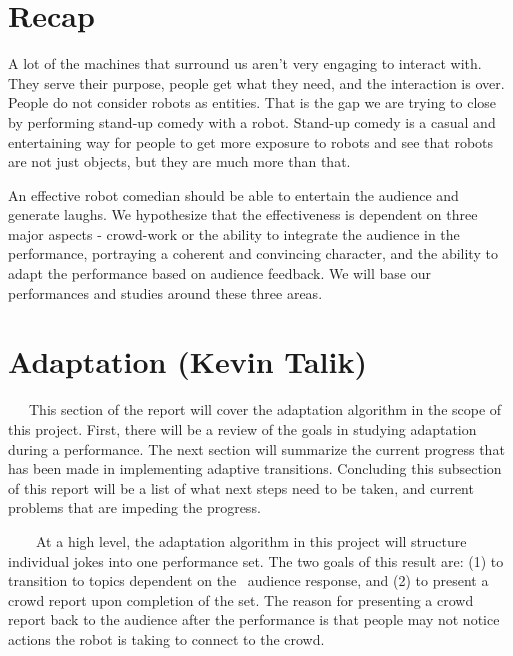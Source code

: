 ﻿\documentclass[onecolumn, draftclsnofoot,10pt, compsoc]{IEEEtran}
\begin{document}
\section{Recap}

A lot of the machines that surround us aren't very engaging to interact with. They serve their purpose, people get what they need, and the interaction is over. People do not consider robots as entities. That is the gap we are trying to close by performing stand-up comedy with a robot. Stand-up comedy is a casual and entertaining way for people to get more exposure to robots and see that robots are not just objects, but they are much more than that.

An effective robot comedian should be able to entertain the audience and generate laughs. We hypothesize that the effectiveness is dependent on three major aspects - crowd-work or the ability to integrate the audience in the performance, portraying a coherent and convincing character, and the ability to adapt the performance based on audience feedback. We will base our performances and studies around these three areas.

\section{Adaptation (Kevin Talik)}
   This section of the report will cover the adaptation algorithm in the scope of this project. First, there will be a review of the goals in studying adaptation during a performance. The next section will summarize the current progress that has been made in implementing adaptive transitions. Concluding this subsection of this report will be a list of what next steps need to be taken, and current problems that are impeding the progress.   

    At a high level, the adaptation algorithm in this project will structure individual jokes into one performance set. The two goals of this result are: (1) to transition to topics dependent on the
 audience response, and (2) to present a crowd report upon completion of the set. The reason for presenting a crowd report back to the audience after the performance is that people may not notice actions the robot is taking to connect to the crowd. 
\end{document}
